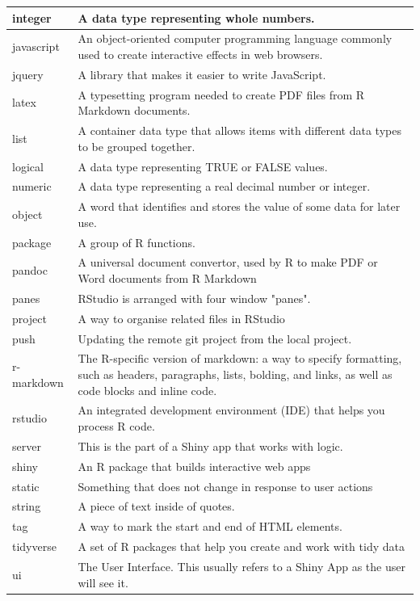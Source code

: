 \documentclass[
  oneside]{book}
\begin{document}
\begin{tabular}{l|l}
\hline
integer & A data type representing whole numbers.\\
\hline
javascript & An object-oriented computer programming language commonly used to create interactive effects in web browsers.\\
\hline
jquery & A library that makes it easier to write JavaScript.\\
\hline
latex & A typesetting program needed to create PDF files from R Markdown documents.\\
\hline
list & A container data type that allows items with different data types to be grouped together.\\
\hline
logical & A data type representing TRUE or FALSE values.\\
\hline
numeric & A data type representing a real decimal number or integer.\\
\hline
object & A word that identifies and stores the value of some data for later use.\\
\hline
package & A group of R functions.\\
\hline
pandoc & A universal document convertor, used by R to make PDF or Word documents from R Markdown\\
\hline
panes & RStudio is arranged with four window "panes".\\
\hline
project & A way to organise related files in RStudio\\
\hline
push & Updating the remote git project from the local project.\\
\hline
r-markdown & The R-specific version of markdown: a way to specify formatting, such as headers, paragraphs, lists, bolding, and links, as well as code blocks and inline code.\\
\hline
rstudio & An integrated development environment (IDE) that helps you process R code.\\
\hline
server & This is the part of a Shiny app that works with logic.\\
\hline
shiny & An R package that builds interactive web apps\\
\hline
static & Something that does not change in response to user actions\\
\hline
string & A piece of text inside of quotes.\\
\hline
tag & A way to mark the start and end of HTML elements.\\
\hline
tidyverse & A set of R packages that help you create and work with tidy data\\
\hline
ui & The User Interface. This usually refers to a Shiny App as the user will see it.\\

\end{tabular}
\end{document}
